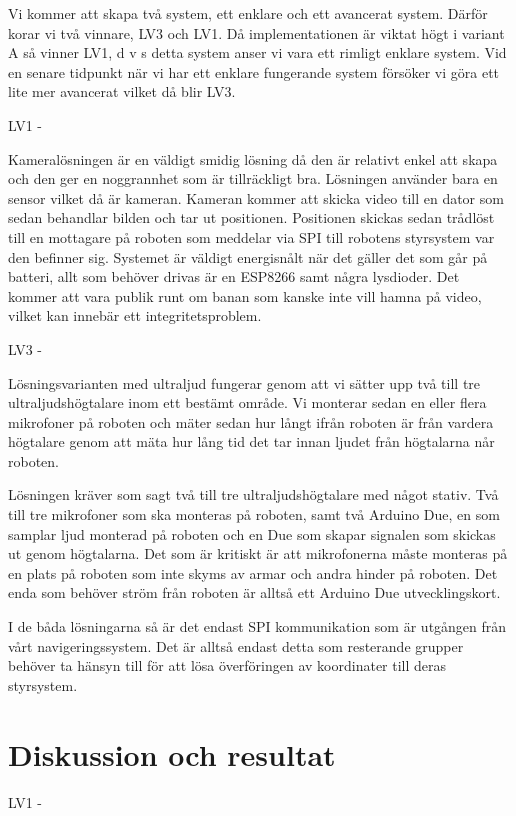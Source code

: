 \documentclass[11pt, a4paper]{report}
\begin{document}
Vi kommer att skapa två system, ett enklare och ett avancerat system. Därför korar vi två vinnare, LV3 och LV1. Då implementationen är viktat högt i variant A så vinner LV1, d v s detta system anser vi vara ett rimligt enklare system. Vid en senare tidpunkt när vi har ett enklare fungerande system försöker vi göra ett lite mer avancerat vilket då blir LV3.


LV1 -

Kameralösningen är en väldigt smidig lösning då den är relativt enkel att skapa och den ger en noggrannhet som är tillräckligt bra. Lösningen använder bara en sensor vilket då är kameran.
Kameran kommer att skicka video till en dator som sedan behandlar bilden och tar ut positionen. Positionen skickas sedan trådlöst till en mottagare på roboten som meddelar via SPI till robotens styrsystem var den befinner sig. Systemet är väldigt energisnålt när det gäller det som går på batteri, allt som behöver drivas är en ESP8266 samt några lysdioder. Det kommer att vara publik runt om banan som kanske inte vill hamna på video, vilket kan innebär ett integritetsproblem.


LV3 -

Lösningsvarianten med ultraljud fungerar genom att vi sätter upp två till tre ultraljudshögtalare inom ett bestämt område. Vi monterar sedan en eller flera mikrofoner på roboten och mäter sedan hur långt ifrån roboten är från vardera högtalare genom att mäta hur lång tid det tar innan ljudet från högtalarna når roboten.

Lösningen kräver som sagt två till tre ultraljudshögtalare med något stativ. Två till tre mikrofoner som ska monteras på roboten, samt två Arduino Due, en som samplar ljud monterad på roboten och en Due som skapar signalen som skickas ut genom högtalarna.
Det som är kritiskt är att mikrofonerna måste monteras på en plats på roboten som inte skyms av armar och andra hinder på roboten.
Det enda som behöver ström från roboten är alltså ett Arduino Due utvecklingskort.


I de båda lösningarna så är det endast SPI kommunikation som är utgången från vårt navigeringssystem. Det är alltså endast detta som resterande grupper behöver ta hänsyn till för att lösa överföringen av koordinater till deras styrsystem.

\section{Diskussion och resultat}

LV1 -
\end{document}
